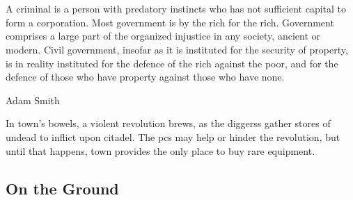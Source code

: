 \chapter{}
\epigraph{A criminal is a person with predatory instincts who has not sufficient capital to form a corporation. Most government is by the rich for the rich.
Government comprises a large part of the organized injustice in any society, ancient or modern.
Civil government, insofar as it is instituted for the security of property, is in reality instituted for the defence of the rich against the poor, and for the defence of those who have property against those who have none.}%
{Adam Smith}

\label{townChapter}

\noindent
In \gls{town}'s bowels, a violent revolution brews, as the \glspl{diggers} gather stores of undead to inflict upon \gls{citadel}.
The \glspl{pc} may help or hinder the revolution, but until that happens, \gls{town} provides the only place to buy rare equipment.



\section{On the Ground}

